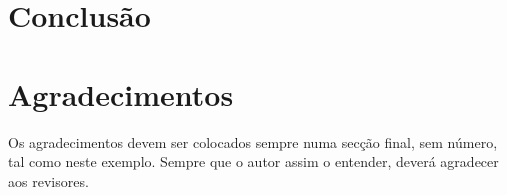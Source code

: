 \documentclass[a4paper, twocolumn, 11pt, twoside]{article}
\begin{document}
  
  
 
\section{Conclusão}

\section*{Agradecimentos}

Os agradecimentos devem ser colocados sempre numa secção final, sem número, tal como
neste exemplo. Sempre que o autor assim o entender, deverá agradecer aos revisores.



\end{document}
